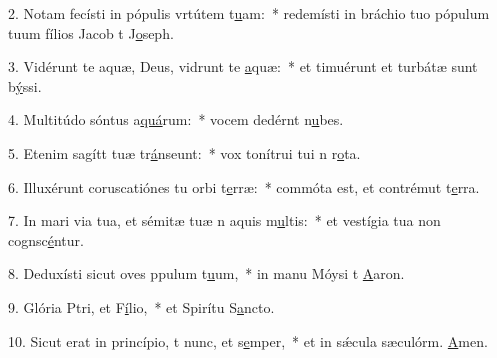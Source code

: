 2. Notam fecísti in pópulis vrtútem t\uline{u}am:~* redemísti in bráchio tuo pópulum tuum fílios Jacob t J\uline{o}seph.\par 
3. Vidérunt te aquæ, Deus, vidrunt te \uline{a}quæ:~* et timuérunt et turbátæ sunt b\uline{ý}ssi.\par 
4. Multitúdo sóntus a\uline{quá}rum:~* vocem dedérnt n\uline{u}bes.\par 
5. Etenim sagítt tuæ tr\uline{á}nseunt:~* vox tonítrui tui n r\uline{o}ta.\par 
6. Illuxérunt coruscatiónes tu orbi t\uline{e}rræ:~* commóta est, et contrémut t\uline{e}rra.\par 
7. In mari via tua, et sémitæ tuæ n aquis m\uline{u}ltis:~* et vestígia tua non cognsc\uline{é}ntur.\par 
8. Deduxísti sicut oves ppulum t\uline{u}um,~* in manu Móysi t \uline{A}aron.\par 
9. Glória Ptri, et F\uline{í}lio,~* et Spirítu S\uline{a}ncto.\par 
10. Sicut erat in princípio, t nunc, et s\uline{e}mper,~* et in sǽcula sæculórm. \uline{A}men.\par 
